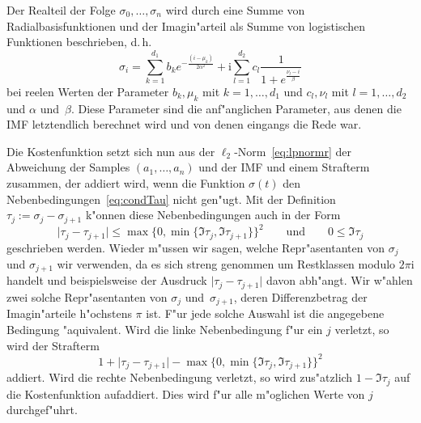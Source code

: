 \documentclass[a4paper]{scrartcl}
\newcommand{\ii}{{\mathrm{i}}}
\begin{document}
Der Realteil der Folge $\sigma_0,\ldots,\sigma_n$ wird durch eine Summe von Radialbasisfunktionen und der Imagin"arteil als Summe von logistischen Funktionen beschrieben, d.\,h. 
$$ \sigma_i = \sum_{k=1}^{d_1}b_ke^{-\frac{(i-\mu_k)}{2\alpha^2}} + \ii\sum_{l=1}^{d_2}c_l\frac{1}{1+e^\frac{\nu_l-i}{\beta}} $$
bei reelen Werten der Parameter $b_k, \mu_k$ mit $k=1,\ldots,d_1$ und $c_l, \nu_l$ mit $l=1,\ldots,d_2$ und $\alpha$ und~$\beta$. 
Diese Parameter sind die anf"anglichen Parameter, aus denen die IMF letztendlich berechnet wird und von denen eingangs die Rede war. 

Die Kostenfunktion setzt sich nun aus der $\ell_2$-Norm~\eqref{eq:lpnormr} der Abweichung der Samples $(a_1,\ldots,a_n)$ und der IMF und einem Strafterm zusammen, der addiert wird, wenn die Funktion $\sigma(t)$ den Nebenbedingungen~\eqref{eq:condTau} nicht gen"ugt. 
Mit der Definition
$ \tau_j := \sigma_j-\sigma_{j+1} $ 
k"onnen diese Nebenbedingungen auch in der Form 
$$ \lvert\tau_j-\tau_{j+1}\rvert \le \max\{0,\min\{\Im\tau_j,\Im\tau_{j+1}\}\}^2
\qquad \text{und} \qquad
0\le\Im\tau_j $$
geschrieben werden. 
Wieder m"ussen wir sagen, welche Repr"asentanten von $\sigma_j$ und $\sigma_{j+1}$ wir verwenden, da es sich streng genommen um Restklassen modulo $2\pi\ii$ handelt und beispielsweise der Ausdruck $\lvert\tau_j-\tau_{j+1}\rvert$ davon abh"angt. 
Wir w"ahlen zwei solche Repr"asentanten von $\sigma_j$ und~$\sigma_{j+1}$, deren Differenzbetrag der Imagin"arteile h"ochstens $\pi$ ist. 
F"ur jede solche Auswahl ist die angegebene Bedingung "aquivalent. 
Wird die linke Nebenbedingung f"ur ein $j$ verletzt, so wird der Strafterm
$$ 1 + \lvert\tau_j-\tau_{j+1}\rvert - \max\{0,\min\{\Im\tau_j,\Im\tau_{j+1}\}\}^2 $$
addiert. Wird die rechte Nebenbedingung verletzt, so wird zus"atzlich 
$ 1 - \Im\tau_j $
auf die Kostenfunktion aufaddiert. 
Dies wird f"ur alle m"oglichen Werte von $j$ durchgef"uhrt. 

\end{document}
